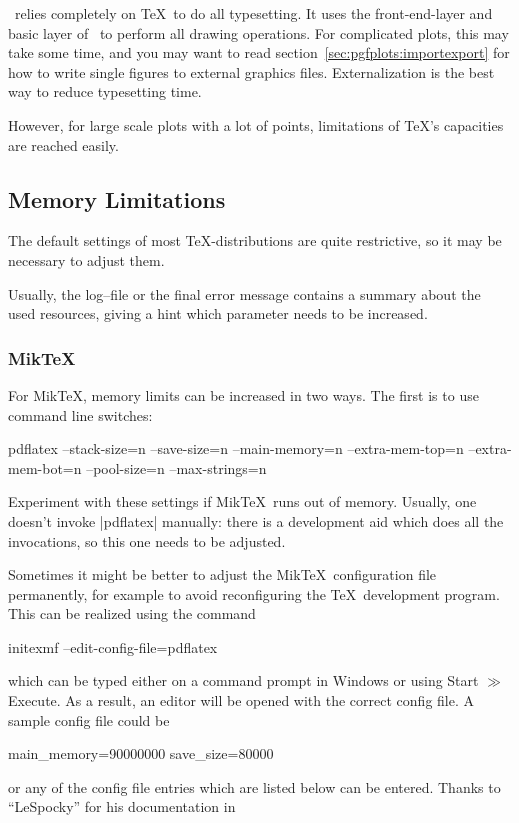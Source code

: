 {\PGFPlots\ relies completely on \TeX\ to do all typesetting. It uses the front-end-layer and basic layer of \PGF\ to perform all drawing operations. For complicated plots, this may take some time, and you may want to read section~\ref{sec:pgfplots:importexport} for how to write single figures to external graphics files. Externalization is the best way to reduce typesetting time.

However, for large scale plots with a lot of points, limitations of \TeX's capacities are reached easily.

\subsection{Memory Limitations}
The default settings of most \TeX-distributions are quite restrictive, so it may be necessary to adjust them. 

Usually, the log--file or the final error message contains a summary about the used resources, giving a hint which parameter needs to be increased.

\subsubsection{Mik\TeX}
For Mik\TeX, memory limits can be increased in two ways. The first is to use command line switches:
\begin{codeexample}
pdflatex 
	--stack-size=n --save-size=n 
	--main-memory=n --extra-mem-top=n --extra-mem-bot=n
	--pool-size=n --max-strings=n 
\end{codeexample}
\noindent Experiment with these settings if Mik\TeX\ runs out of memory. Usually, one doesn't invoke |pdflatex| manually: there is a development aid which does all the invocations, so this one needs to be adjusted. 

Sometimes it might be better to adjust the Mik\TeX\ configuration file permanently, for example to avoid reconfiguring the \TeX\ development program. This can be realized using the command
\begin{codeexample}
initexmf --edit-config-file=pdflatex
\end{codeexample}
\noindent which can be typed either on a command prompt in Windows or using Start $\gg$ Execute. As a result, an editor will be opened with the correct config file. A sample config file could be
\begin{codeexample}
main_memory=90000000
save_size=80000
\end{codeexample}
or any of the config file entries which are listed below can be entered. 
Thanks to ``LeSpocky'' for his documentation in

}

